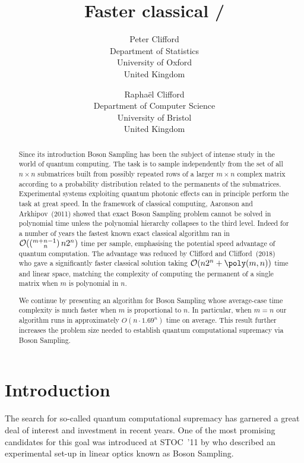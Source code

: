 \documentclass[a4paper,11pt]{article}
\title{Faster classical \BS/ }
\author{Peter Clifford\\
 {\normalsize Department of Statistics}\\
  {\normalsize University of Oxford}\\
  {\normalsize United Kingdom}\\
  \and
  Rapha\"el Clifford\\
  {\normalsize Department of Computer Science}\\
  {\normalsize University of Bristol}\\
  {\normalsize  United Kingdom}\\
  }
\date{\vspace{-1ex}}
\newcommand{\bigo}[1]{\mathcal{O}(#1)}
\newcommand{\multichoose}[2]{(^{#1+#2-1}_{\hphantom{#1+}#2})}
\def\BS/{Boson Sampling}
\begin{document}
\maketitle
\thispagestyle{empty}

\begin{abstract}
	 Since its introduction \BS/ has been the subject of intense study in the world of quantum computing. The task is to sample independently from the set of all $n \times n$ submatrices built from possibly repeated rows of a larger $m \times n$ complex matrix according to a probability distribution related to the permanents of the submatrices.  Experimental systems exploiting quantum photonic effects  can in principle perform the task at great speed.  In the framework of classical computing, Aaronson and Arkhipov~(2011) showed that exact \BS/ problem cannot be solved in polynomial time  unless the polynomial hierarchy collapses to the third level. Indeed for a number of years the fastest known exact classical algorithm ran in $\bigo{\multichoose{m}{n}\, n 2^n }$ time per sample, emphasising the potential speed advantage of quantum computation. The advantage was reduced by Clifford and Clifford~(2018) who gave a significantly faster classical solution taking $\bigo{n 2^n + \poly(m,n)}$ time and linear space, matching the complexity of computing the permanent of a single matrix when $m$ is polynomial in $n$.
	
   We continue by presenting an algorithm for \BS/ whose average-case time complexity is much  faster when $m$ is proportional to 
$n$. In particular, when $m = n$ our algorithm runs in approximately  $O(n\cdot1.69^n)$ time on average.  This result further increases the problem size needed to establish quantum computational supremacy via \BS/.
\end{abstract}


\setcounter{page}{1}
\section{Introduction}

The search for so-called quantum computational supremacy has garnered a great deal of interest and investment in recent years.  One of the most promising candidates for this goal was introduced at STOC~'11 by \citeauthor{aaronson2011computational} who described an experimental set-up in linear optics known as \BS/.  
\end{document}
